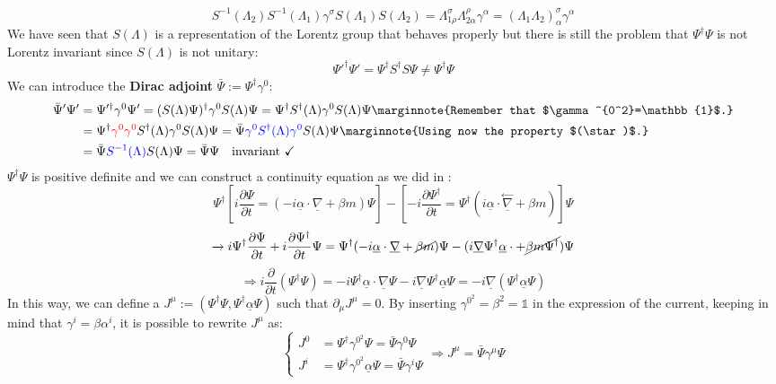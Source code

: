 \documentclass[../main.tex]{subfiles}
\begin{document}
\[
S^{-1}(\Lambda_2)S^{-1}(\Lambda_1)\gamma^\sigma S(\Lambda_1)S(\Lambda_2)=\Lambda^\sigma_{1\rho}\Lambda^\rho_{2\alpha}\gamma^\alpha=(\Lambda_1\Lambda_2)^\sigma_\alpha\gamma^\alpha
\]
We have seen that $S(\Lambda)$ is a representation of the Lorentz group that behaves properly but there is still the problem that $\Psi^\dagger\Psi$ is not Lorentz invariant since $S(\Lambda)$ is not unitary:
\[
\Psi'^\dagger\Psi'=\Psi^\dagger S^\dagger S\Psi\neq\Psi^\dagger\Psi
\]
We can introduce the \textbf{Dirac adjoint} $\bar{\Psi}:=\Psi^\dagger\gamma^0$:
\begin{align*}
\bar{\Psi}'\Psi'&=\Psi'^\dagger\gamma^0\Psi'=(S(\Lambda)\Psi)^\dagger\gamma^0S(\Lambda)\Psi=\Psi^\dagger S^\dagger(\Lambda)\gamma^0S(\Lambda)\Psi\marginnote{Remember that $\gamma^{0^2}=\mathbb{1}$.}\\
&=\Psi^\dagger{\color{red}\gamma^0\gamma^0}S^\dagger(\Lambda)\gamma^0S(\Lambda)\Psi=\bar{\Psi}{\color{blue}\gamma^0S^\dagger(\Lambda)\gamma^0}S(\Lambda)\Psi\marginnote{Using now the property $(\star)$.}\\
&=\bar{\Psi}{\color{blue}S^{-1}(\Lambda)}S(\Lambda)\Psi=\bar{\Psi}\Psi \quad \text{invariant \checkmark}
\end{align*}
$\Psi^\dagger\Psi$ is positive definite and we can construct a continuity equation as we did in :
\[
\Psi^\dagger\left[i\frac{\partial\Psi}{\partial t}=(-i\underline{\alpha}\cdot\underline{\nabla}+\beta m)\Psi\right]-\left[-i\frac{\partial\Psi^\dagger}{\partial t}=\Psi^\dagger(i\underline{\alpha}\cdot\overset{\leftarrow}{\underline{\nabla}}+\beta m)\right]\Psi
\]
\[
\xrightarrow[]{}i\Psi^\dagger\frac{\partial\Psi}{\partial t}+i\frac{\partial\Psi^\dagger}{\partial t}\Psi=\Psi^\dagger(-i\underline{\alpha}\cdot\underline{\nabla}+\cancel{\beta m})\Psi-(i\underline{\nabla}\Psi^\dagger\underline{\alpha}\cdot+\cancel{\beta m\Psi^\dagger} )\Psi
\]
\[
\Rightarrow i\frac{\partial}{\partial t}(\Psi^\dagger\Psi)=-i\Psi^\dagger\underline{\alpha}\cdot\underline{\nabla}\Psi-i\underline{\nabla}\Psi^\dagger\underline{\alpha}\Psi=-i\underline{\nabla}(\Psi^\dagger\underline{\alpha}\Psi)
\]
In this way, we can define a  $J^\mu:=(\Psi^\dagger\Psi,\Psi^\dagger\underline{\alpha}\Psi)$ such that $\partial_\mu J^\mu=0$. By inserting $\gamma^{0^2}=\beta^2=\mathbb{1}$ in the expression of the current, keeping in mind that $\gamma^i=\beta\alpha^i$, it is possible to rewrite $J^\mu$ as:
\[
\left\{
\begin{aligned}
J^0&=\Psi^\dagger\gamma^{0^2}\Psi=\bar{\Psi}\gamma^0\Psi\\
J^i&=\Psi^\dagger\gamma^{0^2}\underline{\alpha}\Psi=\bar{\Psi}\gamma^i\Psi
\end{aligned}
\right.
\Rightarrow J^\mu=\bar{\Psi}\gamma^\mu\Psi
\]
\end{document}
